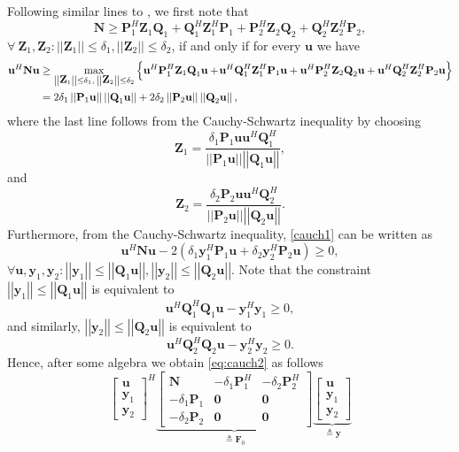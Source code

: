 \documentclass[review,sort&compress]{elsarticle}
\renewcommand{\vec}[1]{\mbox{$\mathbf{#1}$}}
\newcommand{\norm}[1]{\left|\left|#1\right|\right|}
\newcommand{\defi}{\triangleq}
\newcommand{\nn}{\nonumber}
\newcommand{\vy}{\vec{y}}
\newcommand{\vP}{\vec{P}}
\newcommand{\vQ}{\vec{Q}}
\newcommand{\vN}{\vec{N}}
\newcommand{\vZ}{\vec{Z}}
\newcommand{\vu}{\vec{u}}
\newcommand{\vF}{\vec{F}}
\begin{document}
\begin{pop1}
Following similar lines to \cite{yonina1}, we first note that
\[
\vN \geq \vP_1^H \vZ_1 \vQ_1 + \vQ_1^H \vZ_1^H \vP_1 + \vP_2^H \vZ_2 \vQ_2 + \vQ_2^H \vZ_2^H \vP_2,
\]
$\forall \: \vZ_1, \vZ_2 : \norm{\vZ_1} \leq \delta_1, \norm{\vZ_2} \leq \delta_2$, if and only if for every $\vu$ we have
\begin{align}\label{cauch1}
    \vu^H \vN \vu & \geq \max_{\norm{\vZ_1} \leq \delta_1, \: \norm{\vZ_2} \leq \delta_2} \left\{ \vu^H \vP_1^H \vZ_1 \vQ_1 \vu + \hspace{-0.05cm} \vu^H \vQ_1^H \vZ_1^H \vP_1 \vu + \vu^H \vP_2^H \vZ_2 \vQ_2 \vu + \vu^H \vQ_2^H \vZ_2^H \vP_2 \vu \right\} \nn\\
    & = 2 \delta_1 \norm{\vP_1 \vu} \norm{\vQ_1 \vu} + 2 \delta_2 \norm{\vP_2 \vu} \norm{\vQ_2 \vu},
\end{align}
where the last line follows from the Cauchy-Schwartz inequality by choosing
\[
\vZ_1 = \frac{\delta_1 \vP_1 \vu \vu^H \vQ_1^H }{ \norm{\vP_1 \vu} \norm{\vQ_1 \vu} },
\]
and
\[
\vZ_2 = \frac{\delta_2 \vP_2 \vu \vu^H \vQ_2^H }{ \norm{\vP_2 \vu} \norm{\vQ_2 \vu} }.
\]
Furthermore, from the Cauchy-Schwartz inequality, \eqref{cauch1} can be written as
\begin{equation}\label{eq:cauch2}
  \vu^H \vN \vu - 2 \left( \delta_1 \vy_1^H \vP_1 \vu + \delta_2 \vy_2^H \vP_2 \vu \right) \geq 0,
\end{equation}
$\forall \vu, \vy_1, \vy_2 : \norm{\vy_1} \leq \norm{\vQ_1 \vu}, \norm{\vy_2}\leq \norm{\vQ_2\vu}$. Note that the constraint $\norm{\vy_1}\leq \norm{\vQ_1 \vu}$ is equivalent to
\[
\vu^H \vQ_1^H \vQ_1 \vu - \vy_1^H \vy_1 \geq 0,
\]
and similarly, $\norm{\vy_2}\leq \norm{\vQ_2 \vu}$ is equivalent to
\[
\vu^H \vQ_2^H \vQ_2 \vu - \vy_2^H \vy_2 \geq 0.
\]
Hence, after some algebra we obtain \eqref{eq:cauch2} as follows
\[
\begin{bmatrix} \vu \\ \vy_1 \\ \vy_2 \end{bmatrix}^H
\underbrace{\begin{bmatrix}
\vN              & -\delta_1 \vP_1^H & -\delta_2 \vP_2^H \\
-\delta_1 \vP_1  & \vec{0}           & \vec{0} \\
-\delta_2 \vP_2  & \vec{0}           & \vec{0}
\end{bmatrix}}_{\defi \vF_0}
\underbrace{\begin{bmatrix} \vu \\ \vy_1 \\ \vy_2 \end{bmatrix}}_{\defi \vy}
\]
\end{pop1}
\end{document}
